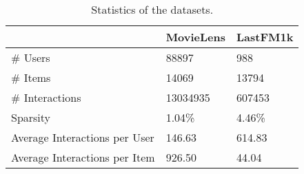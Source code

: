 \begin{table}
\caption{Statistics of the datasets.}
\label{tab:datasets}
\begin{tabular}{lll}
\toprule
 & MovieLens & LastFM1k \\
\midrule
\# Users & 88897 & 988 \\
\# Items & 14069 & 13794 \\
\# Interactions & 13034935 & 607453 \\
Sparsity & 1.04\% & 4.46\% \\
Average Interactions per User & 146.63 & 614.83 \\
Average Interactions per Item & 926.50 & 44.04 \\
\bottomrule
\end{tabular}
\end{table}
